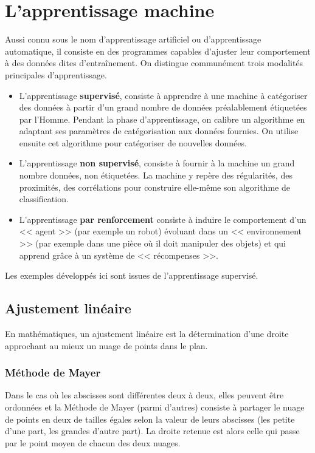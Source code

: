 \documentclass[a4paper,10pt]{report}
\theoremstyle{exo}
\theoremstyle{exercice}
\begin{document}
\section{L'apprentissage machine}

Aussi connu sous le nom d'apprentissage artificiel ou d'apprentissage automatique, il
consiste en des programmes capables d'ajuster leur comportement à des données dites
d'entraînement. On distingue communément trois modalités principales d'apprentissage.

\begin{itemize}
    \item L'apprentissage {\bfseries supervisé}, consiste à apprendre à une machine à catégoriser des données à partir d'un grand nombre de données préalablement étiquetées par l'Homme. Pendant la phase d'apprentissage, on calibre un algorithme en adaptant ses paramètres de catégorisation aux données fournies. On utilise ensuite cet algorithme pour catégoriser de nouvelles données.
    \item L'apprentissage {\bfseries non supervisé}, consiste à fournir à la machine un grand nombre données, non étiquetées. La machine y repère des régularités, des proximités, des corrélations pour construire elle-même son algorithme de classification.
    \item L'apprentissage {\bfseries par renforcement} consiste à induire le comportement d'un << agent >> (par exemple un robot) évoluant dans un << environnement >> (par exemple dans une pièce où il doit manipuler des objets) et qui apprend grâce à un système de << récompenses >>.
\end{itemize} 

\medskip
Les exemples développés ici sont issues de l'apprentissage supervisé.

\subsection{Ajustement linéaire}

En mathématiques, un ajustement linéaire est la détermination d'une droite approchant au mieux un nuage de points dans le plan.


\subsubsection{Méthode de Mayer}

Dans le cas où les abscisses sont différentes deux à deux, elles peuvent être ordonnées et la Méthode de Mayer (parmi d'autres) consiste à partager le nuage de points en deux de tailles égales selon la valeur de leurs abscisses (les petite d'une part, les grandes d'autre part). La droite retenue est alors celle qui passe par le point moyen de chacun des deux nuages.
\end{document}
